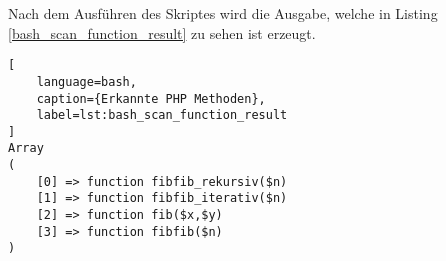 Nach dem Ausführen des Skriptes wird die Ausgabe, welche in Listing \ref{bash_scan_function_result} zu sehen ist erzeugt.

\begin{lstlisting}[
	language=bash,
	caption={Erkannte PHP Methoden},
	label=lst:bash_scan_function_result
]
Array
(
    [0] => function fibfib_rekursiv($n)
    [1] => function fibfib_iterativ($n)
    [2] => function fib($x,$y)
    [3] => function fibfib($n)
)
\end{lstlisting}

